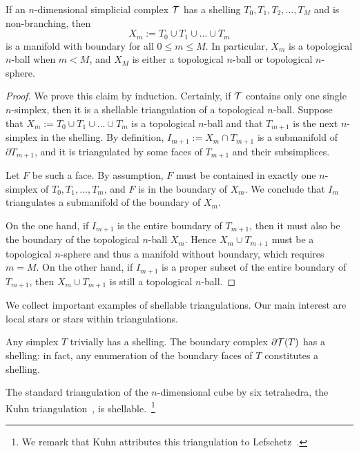 \documentclass[12pt,a4paper]{article}
\begin{document}
\begin{lemma}    
    If an $n$-dimensional simplicial complex ${\mathcal T}$ has a shelling $T_{0}, T_{1}, T_{2}, \dots, T_{M}$ and is non-branching, %
    then
    $$
        X_{m} := T_{0} \cup T_{1} \cup \dots \cup T_{m}
    $$ 
    is a manifold with boundary for all $0 \leq m \leq M$.
    In particular, $X_{m}$ is a topological $n$-ball when $m < M$, 
    and 
    $X_{M}$ is either a topological $n$-ball or topological $n$-sphere. 
\end{lemma}
\begin{proof}  
    We prove this claim by induction. 
    Certainly, if ${\mathcal T}$ contains only one single $n$-simplex, then it is a shellable triangulation of a topological $n$-ball. 
    Suppose that $X_m := T_{0} \cup T_{1} \cup \dots \cup T_{m}$ is a topological $n$-ball and that $T_{m+1}$ is the next $n$-simplex in the shelling.
    By definition, $I_{m+1} := X_{m} \cap T_{m+1}$ is a submanifold of $\partial T_{m+1}$,
    and it is triangulated by some faces of $T_{m+1}$ and their subsimplices. 
    
    Let $F$ be such a face. 
    By assumption, $F$ must be contained in exactly one $n$-simplex of $T_{0}, T_{1}, \dots, T_{m}$,
    and $F$ is in the boundary of $X_{m}$. We conclude that $I_{m}$ triangulates a submanifold of the boundary of $X_{m}$.
    
    On the one hand, 
    if $I_{m+1}$ is the entire boundary of $T_{m+1}$, 
    then it must also be the boundary of the topological $n$-ball $X_{m}$. 
    Hence $X_{m} \cup T_{m+1}$ must be a topological $n$-sphere and thus a manifold without boundary, which requires $m = M$.
    On the other hand, 
    if $I_{m+1}$ is a proper subset of the entire boundary of $T_{m+1}$, 
    then $X_{m} \cup T_{m+1}$ is still a topological $n$-ball.
\end{proof}






We collect important examples of shellable triangulations.
Our main interest are local stars or stars within triangulations. 

\begin{example}
    Any simplex $T$ trivially has a shelling. The boundary complex $\partial {\mathcal T}(T)$ has a shelling:
    in fact, any enumeration of the boundary faces of $T$ constitutes a shelling.
\end{example}
\begin{example}
    The standard triangulation of the $n$-dimensional cube by six tetrahedra, the Kuhn triangulation~\cite{kuhn1960some}, is shellable.~\footnote{We remark that Kuhn attributes this triangulation to Lefschetz~\cite{lefschetz2015introduction}.}
\end{example}
\end{document}
